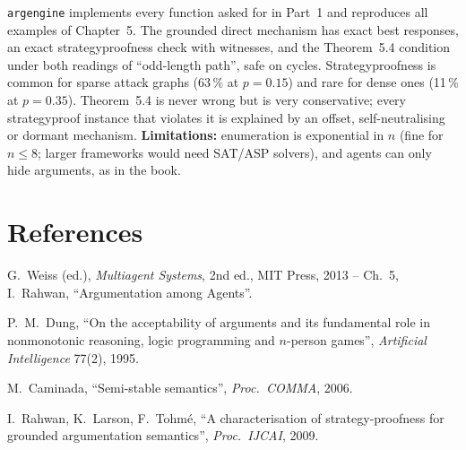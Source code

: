 \documentclass[10pt,a4paper]{article}
\newcommand{\code}[1]{\textcolor{brand!85!black}{\texttt{#1}}}
\begin{document}
\code{argengine} implements every function asked for in Part~1 and reproduces all examples of Chapter~5. The grounded direct
mechanism has exact best responses, an exact strategyproofness check with witnesses, and the Theorem~5.4 condition under both
readings of ``odd-length path'', safe on cycles. Strategyproofness is common for sparse attack graphs (63\,\% at $p=0.15$) and
rare for dense ones (11\,\% at $p=0.35$). Theorem~5.4 is never wrong but is very conservative; every strategyproof instance that
violates it is explained by an offset, self-neutralising or dormant mechanism. \textbf{Limitations:} enumeration is exponential
in $n$ (fine for $n\le8$; larger frameworks would need SAT/ASP solvers), and agents can only hide arguments, as in the book.

\section*{References}
\begin{enumerate}[label={[\arabic*]},leftmargin=2.2em,itemsep=2pt]
  \item G.~Weiss (ed.), \emph{Multiagent Systems}, 2nd ed., MIT Press, 2013 -- Ch.~5, I.~Rahwan, ``Argumentation among Agents''.
  \item P.~M.~Dung, ``On the acceptability of arguments and its fundamental role in nonmonotonic reasoning, logic programming
        and $n$-person games'', \emph{Artificial Intelligence} 77(2), 1995.
  \item M.~Caminada, ``Semi-stable semantics'', \emph{Proc.\ COMMA}, 2006.
  \item I.~Rahwan, K.~Larson, F.~Tohm\'e, ``A characterisation of strategy-proofness for grounded argumentation semantics'',
        \emph{Proc.\ IJCAI}, 2009.
\end{enumerate}
\end{document}

